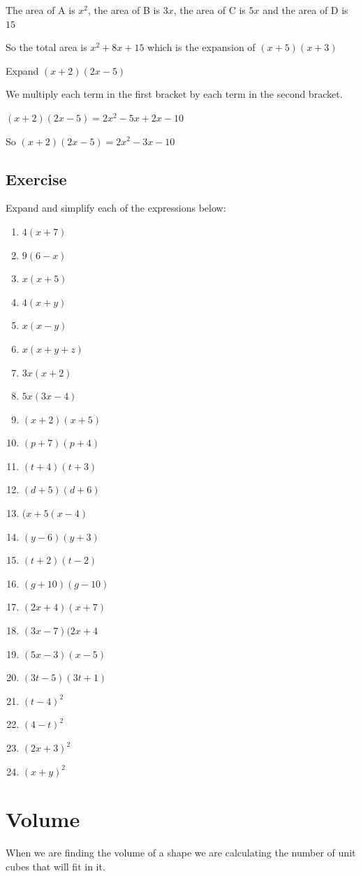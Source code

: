 \bigskip

The area of A is $x^2$, the area of B is $3x$, the area of C is $5x$ and the area of D is $15$

\bigskip

So the total area is $x^2 + 8x + 15$ which is the expansion of $(x+5)(x+3)$

\begin{exmp}
Expand $(x+2)(2x-5)$

\bigskip

We multiply each term in the first bracket by each term in the second bracket.

\bigskip

$(x+2)(2x-5)=2x^2-5x+2x-10$

So $(x+2)(2x-5)=2x^2-3x-10$
\end{exmp}

\subsection{Exercise}
Expand and simplify each of the expressions below:
\begin{multicols}{3}
\begin{enumerate}
	\item $4(x+7)$
	\item $9(6-x)$
	\item $x(x+5)$
	\item $4(x+y)$
	\item $x(x-y)$
	\item $x(x+y+z)$
	\item $3x(x+2)$
	\item $5x(3x-4)$
	\item $(x+2)(x+5)$
	\item $(p+7)(p+4)$
	\item $(t+4)(t+3)$
	\item $(d+5)(d+6)$
	\item $(x+5(x-4)$
	\item $(y-6)(y+3)$
	\item $(t+2)(t-2)$
	\item $(g+10)(g-10)$
	\item $(2x+4)(x+7)$
	\item $(3x-7)(2x+4$
	\item $(5x-3)(x-5)$
	\item $(3t-5)(3t+1)$
	\item $(t-4)^2$
	\item $(4-t)^2$
	\item $(2x+3)^2$
	\item $(x+y)^2$
\end{enumerate}
\end{multicols}

\section{Volume}
When we are finding the volume of a shape we are calculating the number of unit cubes that will fit in it.
